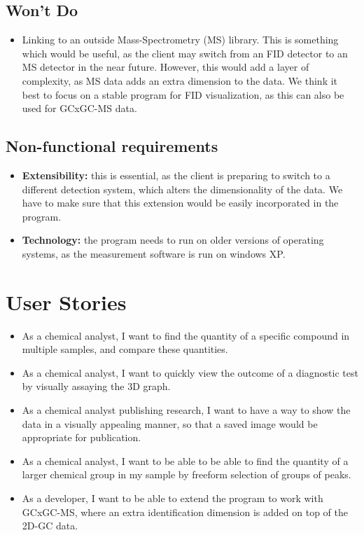 \documentclass{article}
\begin{document}
\subsection*{Won't Do}
\begin{itemize}
	\item Linking to an outside Mass-Spectrometry (MS) library. This is something which would be useful, as the client may switch from an FID detector to an MS detector in the near future. However, this would add a layer of complexity, as MS data adds an extra dimension to the data. We think it best to focus on a stable program for FID visualization, as this can also be used for GCxGC-MS data. 
\end{itemize}
\subsection*{Non-functional requirements}
\begin{itemize}
	\item \textbf{Extensibility:} this is essential, as the client is preparing to switch to a different detection system, which alters the dimensionality of the data. We have to make sure that this extension would be easily incorporated in the program. 
	\item \textbf{Technology:} the program needs to run on older versions of operating systems, as the measurement software is run on windows XP. 
\end{itemize}


\section{User Stories}
\begin{itemize}
	\item As a chemical analyst, I want to find the quantity of a specific compound in multiple samples, and compare these quantities. 
	\item As a chemical analyst, I want to quickly view the outcome of a diagnostic test by visually assaying the 3D graph. 
	\item As a chemical analyst publishing research, I want to have a way to show the data in a visually appealing manner, so that a saved image would be appropriate for publication. 
	\item As a chemical analyst, I want to be able to be able to find the quantity of a larger chemical group in my sample by freeform selection of groups of peaks. 
	\item As a developer, I want to be able to extend the program to work with GCxGC-MS, where an extra identification dimension is added on top of the 2D-GC data. 
\end{itemize}
\end{document}
